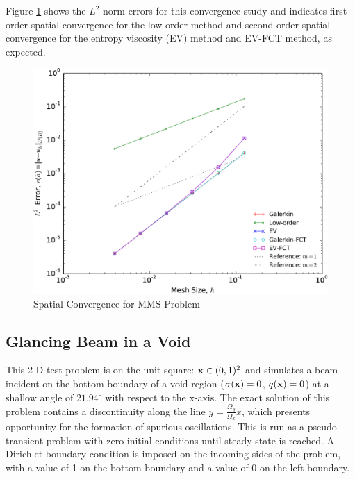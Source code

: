 Figure \ref{fig:mms_sinx_ss} shows the $L^2$ norm errors for this convergence study
and indicates first-order spatial convergence for the low-order method and
second-order spatial convergence for the entropy viscosity (EV) method
and EV-FCT method, as expected.
\begin{figure}[htb]
   \centering
      \includegraphics[width=\textwidth]
        {images/convergence_sinx.pdf}
      \caption{Spatial Convergence for MMS Problem}
   \label{fig:mms_sinx_ss}
\end{figure}
\clearpage
\subsection{Glancing Beam in a Void}
This 2-D test problem is on the unit square: $\mathbf{x}\in(0,1)^2$ and simulates
a beam incident on the bottom boundary of a void region
($\sigma(\mathbf{x})= 0$, $q(\mathbf{x})=0$) at a shallow angle of
$21.94^\circ$ with respect to the x-axis. 
The exact solution of this problem contains a discontinuity along the line
$y = \frac{\Omega_y}{\Omega_x}x$, which presents opportunity for the formation
of spurious oscillations.
This is run as a pseudo-transient problem with zero initial conditions until 
steady-state is reached. A Dirichlet
boundary condition is imposed on the incoming sides of the problem, with a value of 1 
on the bottom boundary and a value of 0 on the left boundary.

